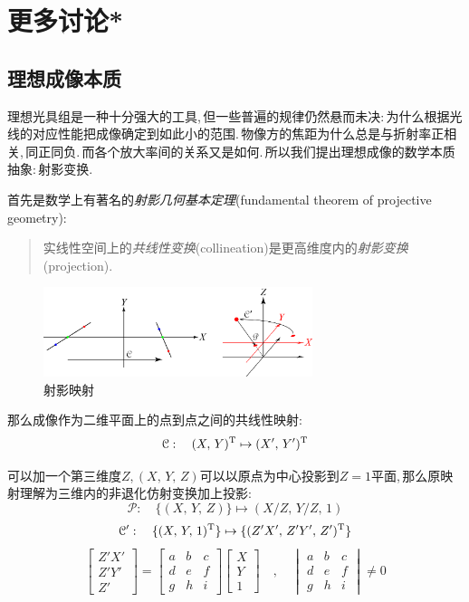 \section{更多讨论*}
\subsection{理想成像本质}
理想光具组是一种十分强大的工具,\,但一些普遍的规律仍然悬而未决:\,为什么根据光线的对应性能把成像确定到如此小的范围.\,物像方的焦距为什么总是与折射率正相关,\,同正同负.\,而各个放大率间的关系又是如何.\,所以我们提出理想成像的数学本质抽象:\,射影变换.

首先是数学上有著名的\emph{射影几何基本定理}(fundamental theorem of projective geometry):

\begin{quote}
\hei 实线性空间上的\emph{共线性变换}(collineation)是更高维度内的\emph{射影变换}(projection).
\end{quote}

\begin{figure}[H]
\centering
\includegraphics[width=0.7\textwidth]{image/5-7-13.png}
\caption{射影映射}
\end{figure}

那么成像作为二维平面上的点到点之间的共线性映射:
\[\mathcal{C}:\quad (X,\,Y)^{\rm T}\mapsto (X',\,Y')^{\rm T}\]

可以加一个第三维度\(Z\),\,\((X,\,Y,\,Z)\)可以以原点为中心投影到\(Z=1\)平面,\,那么原映射理解为三维内的非退化仿射变换加上投影:
\[\mathcal{P}:\quad \{(X,\,Y,\,Z)\}\mapsto(X/Z,\,Y/Z,\,1)\]
\[\mathcal{C'}:\quad \{(X,\,Y,\,1)^{\rm T}\}\mapsto \{(Z'X',\,Z'Y',\,Z')^{\rm T}\}\]
\[\begin{bmatrix} Z'X'\\Z'Y'\\Z' \end{bmatrix}=\begin{bmatrix} a&b&c\\d&e&f\\g&h&i \end{bmatrix}\begin{bmatrix} X\\Y\\1 \end{bmatrix}\quad,\quad \begin{vmatrix} a&b&c\\d&e&f\\g&h&i \end{vmatrix}\neq 0\]

